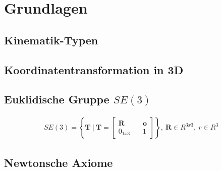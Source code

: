\chapter{Grundlagen}
\label{cha:Grundlagen}


\section{Kinematik-Typen}
\section{Koordinatentransformation in 3D}
\section{Euklidische Gruppe $SE(3)$}
	 \begin{align*} SE(3) = \left\{{\bm{T}} \ | \ \bm{T}=\begin{bmatrix} {\bm{R}} &\quad {\bm{o}}\\ {0}_{1x3} &\quad 1 \end{bmatrix}\right\}, \ \bm{R} \in {R}^{3x3}, \ {r} \in {R}^{3}  \end{align*}



	
\section{Newtonsche Axiome}

	 


